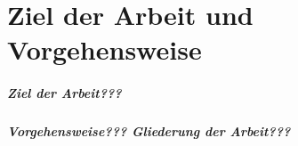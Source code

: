 \chapter{Ziel der Arbeit und Vorgehensweise}
\label{chap:ziel_der_arbeit_und_vorgehensweise}

\paragraph{Ziel der Arbeit???}

\paragraph{Vorgehensweise??? Gliederung der Arbeit???}
